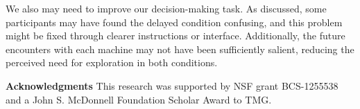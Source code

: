 \documentclass[10pt,letterpaper]{article}
\begin{document}
We also may need to improve our decision-making task. As discussed, some
participants may have found the delayed condition confusing, and this problem
might be fixed through clearer instructions or interface. Additionally, the
future encounters with each machine may not have been sufficiently salient,
reducing the perceived need for exploration in both conditions.

\begin{small}
  \noindent
\textbf{Acknowledgments}  This research was supported by NSF grant BCS-1255538 and a John S. McDonnell Foundation Scholar Award to TMG.
\end{small}



\end{document}

